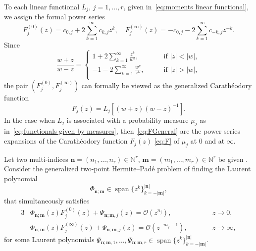 \documentclass[reqno,centertags,11pt,draft]{amsart}
\newcommand{\N}{\mathbb{N}}
\newcommand{\abs}[1]{\left|#1\right|}
\begin{document}
To each linear functional $L_j$, $j=1,\dots,r$, given in~\eqref{eq:moments linear functional}, we assign the formal power series
\begin{equation}
\label{eq:FGeneral}
    F_j^{(0)}(z) = c_{0,j} + 2\sum_{k = 1}^{\infty}c_{k,j}z^k, \quad F_j^{(\infty)}(z) = -c_{0,j} - 2\sum_{k = 1}^{\infty}c_{-k,j}z^{-k}.
\end{equation}
Since
\begin{equation}\label{eq:kernel}
        \frac{w+z}{w-z}
        =
        \begin{cases}
            1+ 2\sum_{k=1}^\infty \frac{z^k}{w^k},\qquad  & \mbox{if } |z|<|w|, \\
            -1 - 2\sum_{k=1}^\infty \frac{w^k}{z^k}, \qquad & \mbox{if } |z|>|w|, \\
        \end{cases}
\end{equation} 
the pair $(F_j^{(0)},F_j^{(\infty)})$ can formally be viewed as the generalized Carath\'{e}odory function
\begin{equation}\label{eq:generalized caratheodory function}
    F_j(z) = L_j[(w+z)(w-z)^{-1}].
\end{equation} 
In the case when $L_j$ is associated with a probability measure $\mu_j$ as in~\eqref{eq:functionals given by measures}, then~\eqref{eq:FGeneral} are the power series expansions of the Carath\'{e}odory function $F_j(z)$ \eqref{eq:F} of $\mu_j$ at $0$ and at $\infty$. 

Let two multi-indices $\bm{n} = (n_1,\dots,n_r)\in\N^r$, $\bm{m} = (m_1,\dots,m_r)\in\N^r$ %
be given%
. Consider the generalized two-point Hermite--Pad\'e problem of finding the Laurent polynomial
\begin{equation}\label{eq:spanFull}
    \Phi_{\bm{n};\bm{m}}
    \in \operatorname{span}\big\{z^k\big\}_{k = -\abs{\bm{m}}}^{\abs{\bm{n}}},
\end{equation}
that simultaneously satisfies
\begin{alignat}{3}
\label{eq:generalized two point hermite pade eq 1}
    & \Phi_{\bm{n};\bm{m}}(z)F_j^{(0)}(z) + \Psi_{\bm{n};\bm{m},j}(z) = \mathcal{O}(z^{n_j}),  \qquad &&z \rightarrow 0, \\\label{eq:generalized two point hermite pade eq 2}
    & \Phi_{\bm{n};\bm{m}}(z)F_j^{(\infty)}(z) + \Psi_{\bm{n};\bm{m},j}(z) = \mathcal{O}(z^{-m_j-1}), \qquad &&z \rightarrow \infty,
\end{alignat}
for some Laurent polynomials $\Psi_{\bm{n};\bm{m},1},\ldots,\Psi_{\bm{n};\bm{m},r} \in \operatorname{span}\big\{z^k\big\}_{k = -\abs{\bm{m}}}^{\abs{\bm{n}}}$.
\end{document}
